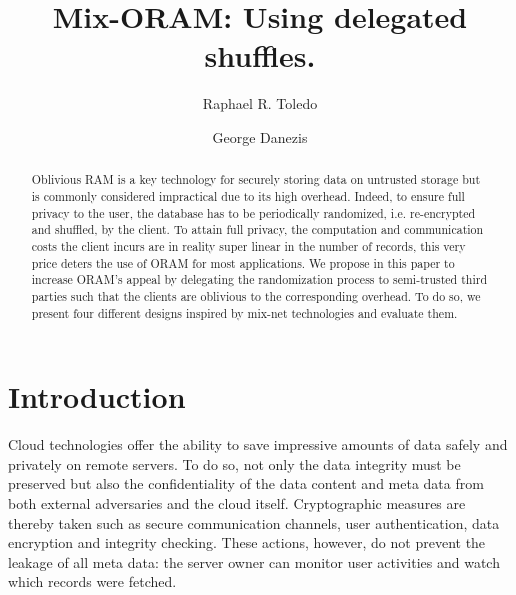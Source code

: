\documentclass[USenglish,oneside,twocolumn]{article}
\begin{document}
 
\author[1]{Raphael R. Toledo}

\author[2]{George Danezis}



  \title{Mix-ORAM: Using delegated shuffles.}

  \begin{abstract}
{
Oblivious RAM is a key technology for securely storing data on untrusted storage but is commonly considered impractical due to its high overhead. Indeed, to ensure full privacy to the user, the database has to be periodically randomized, i.e. re-encrypted and shuffled, by the client. To attain full privacy, the computation and communication costs the client incurs are in reality super linear in the number of records, this very price deters the use of ORAM for most applications. We propose in this paper to increase ORAM's appeal by delegating the randomization process to semi-trusted third parties such that the clients are oblivious to the corresponding overhead. To do so, we present four different designs inspired by mix-net technologies and evaluate them.
}
\end{abstract}



\maketitle
%
\section{Introduction}\label{Introduction}
%

Cloud technologies offer the ability to save impressive amounts of data safely and privately on remote servers. To do so, not only the data integrity must be preserved but also the confidentiality of the data content and meta data from both external adversaries and the cloud itself.
Cryptographic measures are thereby taken such as secure communication channels, user authentication, data encryption and integrity checking.
These actions, however, do not prevent the leakage of all meta data: the server owner can monitor user activities and watch which records were fetched. \\
\end{document}
